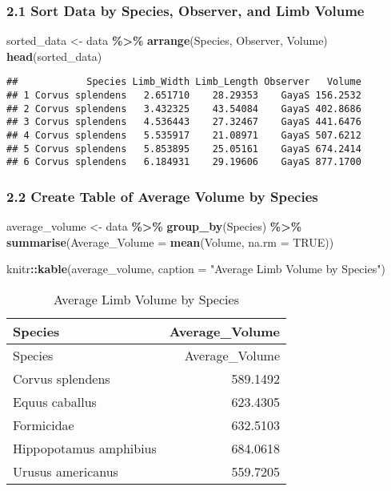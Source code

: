 \documentclass[
]{article}
\newenvironment{Shaded}{\begin{snugshade}}{\end{snugshade}}
\newcommand{\AttributeTok}[1]{\textcolor[rgb]{0.13,0.29,0.53}{#1}}
\newcommand{\ConstantTok}[1]{\textcolor[rgb]{0.56,0.35,0.01}{#1}}
\newcommand{\FunctionTok}[1]{\textcolor[rgb]{0.13,0.29,0.53}{\textbf{#1}}}
\newcommand{\NormalTok}[1]{#1}
\newcommand{\OtherTok}[1]{\textcolor[rgb]{0.56,0.35,0.01}{#1}}
\newcommand{\SpecialCharTok}[1]{\textcolor[rgb]{0.81,0.36,0.00}{\textbf{#1}}}
\newcommand{\StringTok}[1]{\textcolor[rgb]{0.31,0.60,0.02}{#1}}
\begin{document}
\subsubsection{2.1 Sort Data by Species, Observer, and Limb
Volume}\label{sort-data-by-species-observer-and-limb-volume}

\begin{Shaded}
\begin{Highlighting}[]
\NormalTok{sorted\_data }\OtherTok{\textless{}{-}}\NormalTok{ data }\SpecialCharTok{\%\textgreater{}\%} \FunctionTok{arrange}\NormalTok{(Species, Observer, Volume)}
\FunctionTok{head}\NormalTok{(sorted\_data)}
\end{Highlighting}
\end{Shaded}

\begin{verbatim}
##            Species Limb_Width Limb_Length Observer   Volume
## 1 Corvus splendens   2.651710    28.29353    GayaS 156.2532
## 2 Corvus splendens   3.432325    43.54084    GayaS 402.8686
## 3 Corvus splendens   4.536443    27.32467    GayaS 441.6476
## 4 Corvus splendens   5.535917    21.08971    GayaS 507.6212
## 5 Corvus splendens   5.853895    25.05161    GayaS 674.2414
## 6 Corvus splendens   6.184931    29.19606    GayaS 877.1700
\end{verbatim}

\subsubsection{2.2 Create Table of Average Volume by
Species}\label{create-table-of-average-volume-by-species}

\begin{Shaded}
\begin{Highlighting}[]
\NormalTok{average\_volume }\OtherTok{\textless{}{-}}\NormalTok{ data }\SpecialCharTok{\%\textgreater{}\%} 
  \FunctionTok{group\_by}\NormalTok{(Species) }\SpecialCharTok{\%\textgreater{}\%} 
  \FunctionTok{summarise}\NormalTok{(}\AttributeTok{Average\_Volume =} \FunctionTok{mean}\NormalTok{(Volume, }\AttributeTok{na.rm =} \ConstantTok{TRUE}\NormalTok{))}

\NormalTok{knitr}\SpecialCharTok{::}\FunctionTok{kable}\NormalTok{(average\_volume, }\AttributeTok{caption =} \StringTok{"Average Limb Volume by Species"}\NormalTok{)}
\end{Highlighting}
\end{Shaded}

\begin{longtable}[]{@{}lr@{}}
\caption{Average Limb Volume by Species}\tabularnewline
\toprule\noalign{}
Species & Average\_Volume \\
\midrule\noalign{}
\endfirsthead
\toprule\noalign{}
Species & Average\_Volume \\
\midrule\noalign{}
\endhead
\bottomrule\noalign{}
\endlastfoot
Corvus splendens & 589.1492 \\
Equus caballus & 623.4305 \\
Formicidae & 632.5103 \\
Hippopotamus amphibius & 684.0618 \\
Urusus americanus & 559.7205 \\
\end{longtable}
\end{document}
